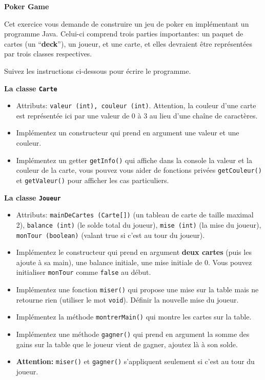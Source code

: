 \begin{Exercice}[15 minutes]\textbf{Poker Game}

Cet exercice vous demande de construire un jeu de poker en implémentant un programme Java. Celui-ci comprend trois parties importantes: un paquet de cartes (un ``\textbf{deck}''), un joueur, et une carte, et elles devraient être représentées par trois classes respectives.

Suivez les instructions ci-dessous pour écrire le programme.

\textbf{La classe \lstinline{Carte}}
\begin{itemize}
    \item Attributs: \lstinline{valeur (int), couleur (int)}. Attention, la couleur d'une carte est représentée ici par une valeur de 0 à 3 au lieu d'une chaîne de caractères.
    \item Implémentez un constructeur qui prend en argument une valeur et une couleur.
    \item Implémentez un getter \lstinline{getInfo()} qui affiche dans la console la valeur et la couleur de la carte, vous pouvez vous aider de fonctions privées
    \lstinline{getCouleur()} et \lstinline{getValeur()} pour afficher les cas particuliers.
\end{itemize}




\textbf{La classe \lstinline{Joueur}}
\begin{itemize}
    \item Attributs: \lstinline{mainDeCartes (Carte[])} (un tableau de carte de taille maximal 2), \lstinline{balance (int)} (le solde total du joueur), \lstinline{mise (int)} (la mise du joueur), \lstinline{monTour (boolean)} (valant true si c’est au tour du joueur).
    \item Implémentez le constructeur qui prend en argument \textbf{deux cartes} (puis les ajoute à sa main), une balance initiale, une mise initiale de 0. Vous pouvez initialiser \lstinline{monTour} comme \lstinline{false} au début.
    \item Implémentez une fonction \lstinline{miser()} qui propose une mise sur la table mais ne retourne rien (utiliser le mot \lstinline{void}). Définir la nouvelle mise du joueur.
    \item Implémentez la méthode \lstinline{montrerMain()} qui montre les cartes sur la table.
    \item Implémentez une méthode \lstinline{gagner()} qui prend en argument la somme des gains sur la table que le joueur vient de gagner, ajoutez là à son solde.
    \item \textbf{Attention:} \lstinline{miser()} et \lstinline{gagner()} s'appliquent seulement si c’est au tour du joueur.
\end{itemize}



\end{Exercice}

